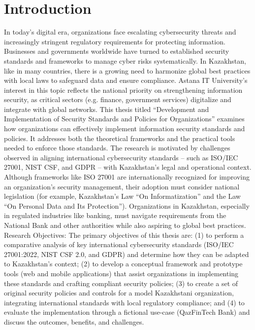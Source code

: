 %
%
\chapter{Introduction}
\noindent\hspace{2em}In today’s digital era, organizations face escalating cybersecurity threats and increasingly stringent regulatory requirements for protecting information. Businesses and governments worldwide have turned to established security standards and frameworks to manage cyber risks systematically. In Kazakhstan, like in many countries, there is a growing need to harmonize global best practices with local laws to safeguard data and ensure compliance. Astana IT University’s interest in this topic reflects the national priority on strengthening information security, as critical sectors (e.g. finance, government services) digitalize and integrate with global networks.
This thesis titled “Development and Implementation of Security Standards and Policies for Organizations” examines how organizations can effectively implement information security standards and policies. It addresses both the theoretical frameworks and the practical tools needed to enforce those standards. The research is motivated by challenges observed in aligning international cybersecurity standards – such as ISO/IEC 27001, NIST CSF, and GDPR – with Kazakhstan’s legal and operational context. Although frameworks like ISO 27001 are internationally recognized for improving an organization’s security management, their adoption must consider national legislation (for example, Kazakhstan’s Law “On Informatization” and the Law “On Personal Data and Its Protection”). Organizations in Kazakhstan, especially in regulated industries like banking, must navigate requirements from the National Bank and other authorities while also aspiring to global best practices.
Research Objectives: The primary objectives of this thesis are: (1) to perform a comparative analysis of key international cybersecurity standards (ISO/IEC 27001:2022, NIST CSF 2.0, and GDPR) and determine how they can be adapted to Kazakhstan’s context; (2) to develop a conceptual framework and prototype tools (web and mobile applications) that assist organizations in implementing these standards and crafting compliant security policies; (3) to create a set of original security policies and controls for a model Kazakhstani organization, integrating international standards with local regulatory compliance; and (4) to evaluate the implementation through a fictional use-case (QazFinTech Bank) and discuss the outcomes, benefits, and challenges.
